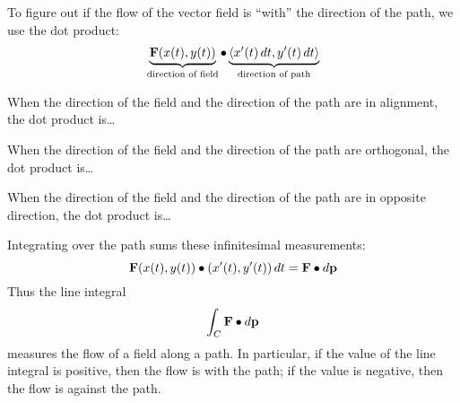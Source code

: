 \documentclass{ximera}
\begin{document}
To figure out if the flow of the vector field is ``with'' the
direction of the path, we use the dot product:
\[
\underbrace{\mathbf{F}(x(t),y(t))}_{\text{direction of field}} \bullet \underbrace{\left\langle x'(t) \mathop{}\!d t,y'(t) \mathop{}\!d t\right\rangle}_{\text{direction of path}}
\]
\begin{question}
When the direction of the field and the direction of the path are in
alignment, the dot product is\dots
\begin{prompt}
  \begin{multipleChoice}
  \end{multipleChoice}
\end{prompt}
\begin{question}
  When the direction of the
  field and the direction of the path are orthogonal, the dot product is\dots
  \begin{prompt}
  \begin{multipleChoice}
  \end{multipleChoice}
\end{prompt}
\begin{question}
  When the direction of the field and the direction of the path are in
  opposite direction, the dot product is\dots
  \begin{prompt}
  \begin{multipleChoice}
  \end{multipleChoice}
  \end{prompt}
\end{question}
\end{question}
\end{question}
Integrating over the path sums these infinitesimal measurements:
\[
\mathbf{F}(x(t),y(t))\bullet (x'(t),y'(t)) \mathop{}\!d t = \mathbf{F} \bullet\mathop{}\!d\mathbf{p}
\]
Thus the line integral
\[
\int_C \mathbf{F}\bullet \mathop{}\!d \mathbf{p}
\]
measures the flow of a field along a path. In particular, if the value
of the line integral is positive, then the flow is with the path; if
the value is negative, then the flow is against the path.
\end{document}
